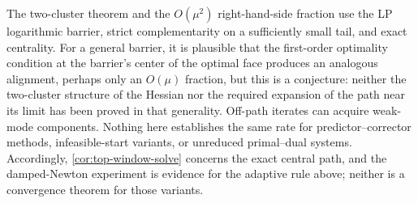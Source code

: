 The two-cluster theorem and the $O(\mu^2)$ right-hand-side fraction use the
LP logarithmic barrier, strict complementarity on a sufficiently small tail,
and exact centrality.  For a general barrier, it is plausible that the
first-order optimality condition at the barrier's center of the optimal face
produces an analogous alignment, perhaps only an $O(\mu)$ fraction, but this
is a conjecture: neither the two-cluster structure of the Hessian nor the
required expansion of the path near its limit has been proved in that
generality.  Off-path iterates can acquire weak-mode components.
Nothing here establishes the same rate for predictor--corrector methods,
infeasible-start variants, or unreduced primal--dual systems.  Accordingly,
\cref{cor:top-window-solve} concerns the exact central path, and the
damped-Newton experiment is evidence for the adaptive rule above; neither is
a convergence theorem for those variants.
